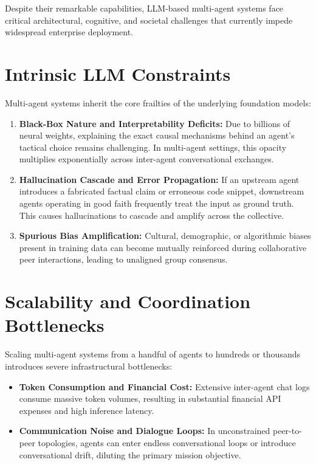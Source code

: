 \documentclass[12pt,a4paper]{report}
\begin{document}
Despite their remarkable capabilities, LLM-based multi-agent systems face critical architectural, cognitive, and societal challenges that currently impede widespread enterprise deployment.

\section{Intrinsic LLM Constraints}
Multi-agent systems inherit the core frailties of the underlying foundation models:
\begin{enumerate}
    \item \textbf{Black-Box Nature and Interpretability Deficits:} Due to billions of neural weights, explaining the exact causal mechanisms behind an agent's tactical choice remains challenging. In multi-agent settings, this opacity multiplies exponentially across inter-agent conversational exchanges.
    \item \textbf{Hallucination Cascade and Error Propagation:} If an upstream agent introduces a fabricated factual claim or erroneous code snippet, downstream agents operating in good faith frequently treat the input as ground truth. This causes hallucinations to cascade and amplify across the collective.
    \item \textbf{Spurious Bias Amplification:} Cultural, demographic, or algorithmic biases present in training data can become mutually reinforced during collaborative peer interactions, leading to unaligned group consensus.
\end{enumerate}

\section{Scalability and Coordination Bottlenecks}
Scaling multi-agent systems from a handful of agents to hundreds or thousands introduces severe infrastructural bottlenecks:
\begin{itemize}
    \item \textbf{Token Consumption and Financial Cost:} Extensive inter-agent chat logs consume massive token volumes, resulting in substantial financial API expenses and high inference latency.
    \item \textbf{Communication Noise and Dialogue Loops:} In unconstrained peer-to-peer topologies, agents can enter endless conversational loops or introduce conversational drift, diluting the primary mission objective.
\end{itemize}
\end{document}
